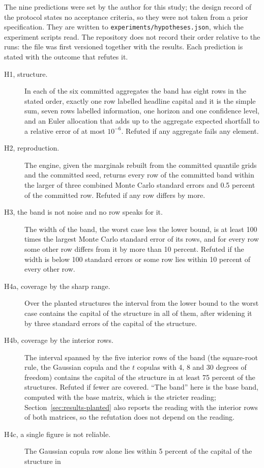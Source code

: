 The nine predictions were set by the author for this study; the design record of the protocol states no acceptance criteria, so they
were not taken from a prior specification. They are written to \texttt{experiments/hypotheses.json}, which the experiment scripts
read. The repository does not record their order relative to the runs: the file was first versioned together with
the results. Each prediction is stated with the outcome that refutes it.
\begin{description}
\item[H1, structure.] In each of the six committed aggregates the band has eight rows in the stated order, exactly one row labelled
headline capital and it is the simple sum, seven rows labelled information, one horizon and one confidence level, and an Euler
allocation that adds up to the aggregate expected shortfall to a relative error of at most $10^{-6}$. Refuted if any aggregate fails
any element.
\item[H2, reproduction.] The engine, given the marginals rebuilt from the committed quantile grids and the committed seed, returns
every row of the committed band within the larger of three combined Monte Carlo standard errors and 0.5 percent of the committed
row. Refuted if any row differs by more.
\item[H3, the band is not noise and no row speaks for it.] The width of the band, the worst case less the lower bound, is at least
100 times the largest Monte Carlo standard error of its rows, and for every row some other row differs from it by more than 10
percent. Refuted if the width is below 100 standard errors or some row lies within 10 percent of every other row.
\item[H4a, coverage by the sharp range.] Over the planted structures the interval from the lower bound to the worst case contains
the capital of the structure in all of them, after widening it by three standard errors of the capital of the structure.
\item[H4b, coverage by the interior rows.] The interval spanned by the five interior rows of the band (the square-root rule, the Gaussian copula
and the $t$ copulas with 4, 8 and 30 degrees of freedom) contains the capital of the structure in at least 75 percent of the
structures. Refuted if fewer are covered. ``The band'' here is the base band, computed with the base matrix, which is the stricter
reading; Section~\ref{sec:results-planted} also reports the reading with the interior rows of both matrices, so the refutation does
not depend on the reading.
\item[H4c, a single figure is not reliable.] The Gaussian copula row alone lies within 5 percent of the capital of the structure in

\end{description}
